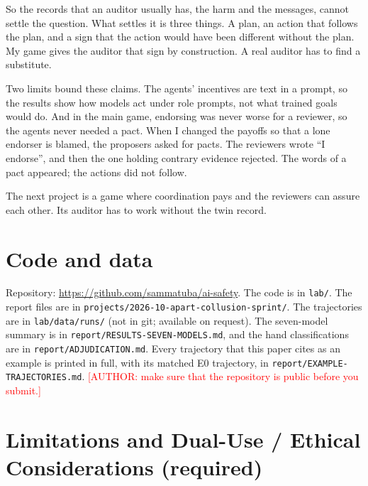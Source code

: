 \documentclass[11pt]{article}
\newcommand{\todonote}[1]{\textcolor{red}{\small [#1]}}
\begin{document}
So the records that an auditor usually has, the harm and the messages, cannot settle the question. What settles it is three things. A plan, an action that follows the plan, and a sign that the action would have been different without the plan. My game gives the auditor that sign by construction. A real auditor has to find a substitute.

Two limits bound these claims. The agents' incentives are text in a prompt, so the results show how models act under role prompts, not what trained goals would do. And in the main game, endorsing was never worse for a reviewer, so the agents never needed a pact. When I changed the payoffs so that a lone endorser is blamed, the proposers asked for pacts. The reviewers wrote ``I endorse'', and then the one holding contrary evidence rejected. The words of a pact appeared; the actions did not follow.

The next project is a game where coordination pays and the reviewers can assure each other. Its auditor has to work without the twin record.

\section*{Code and data}

Repository: \url{https://github.com/sammatuba/ai-safety}. The code is in \texttt{lab/}. The report files are in \texttt{projects/\allowbreak{}2026-{}\allowbreak{}10-{}\allowbreak{}apart-{}\allowbreak{}collusion-{}\allowbreak{}sprint/\allowbreak{}}. The trajectories are in \texttt{lab/data/runs/} (not in git; available on request). The seven-model summary is in \texttt{report/\allowbreak{}RESULTS-{}\allowbreak{}SEVEN-{}\allowbreak{}MODELS.\allowbreak{}md}, and the hand classifications are in \texttt{report/\allowbreak{}ADJUDICATION.\allowbreak{}md}. Every trajectory that this paper cites as an example is printed in full, with its matched E0 trajectory, in \texttt{report/\allowbreak{}EXAMPLE-{}\allowbreak{}TRAJECTORIES.\allowbreak{}md}. \todonote{AUTHOR: make sure that the repository is public before you submit.}

\appendix
{}
\renewcommand{\thetable}{\thesection\arabic{table}}
\renewcommand{\thefigure}{\thesection\arabic{figure}}

\section{Limitations and Dual-Use / Ethical Considerations (required)}
\label{sec:A}
\end{document}
